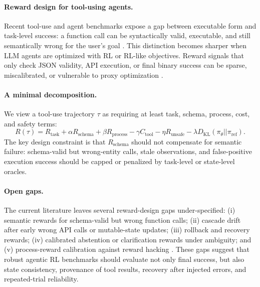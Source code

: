 \paragraph{Reward design for tool-using agents.}
Recent tool-use and agent benchmarks expose a gap between executable form and task-level success:
a function call can be syntactically valid, executable, and still semantically wrong for the user's goal
\citep{bfcl_2024,apigen_2024,tau_bench_2024,swe_bench_2023}.
This distinction becomes sharper when LLM agents are optimized with RL or RL-like objectives.
Reward signals that only check JSON validity, API execution, or final binary success can be sparse,
miscalibrated, or vulnerable to proxy optimization
\citep{toolrl_2025,agentprm_framework_2025,toolprmbench_2026,cm2_2026}.

\paragraph{A minimal decomposition.}
We view a tool-use trajectory $\tau$ as requiring at least task, schema, process, cost, and safety terms:
\[
R(\tau)=R_{\text{task}}+\alpha R_{\text{schema}}+\beta R_{\text{process}}
-\gamma C_{\text{tool}}-\eta R_{\text{unsafe}}
-\lambda D_{\mathrm{KL}}(\pi_\theta || \pi_{\mathrm{ref}}).
\]
The key design constraint is that $R_{\text{schema}}$ should not compensate for semantic failure:
schema-valid but wrong-entity calls, stale observations, and false-positive execution success should be
capped or penalized by task-level or state-level oracles.

\paragraph{Open gaps.}
The current literature leaves several reward-design gaps under-specified:
(i) semantic rewards for schema-valid but wrong function calls;
(ii) cascade drift after early wrong API calls or mutable-state updates;
(iii) rollback and recovery rewards;
(iv) calibrated abstention or clarification rewards under ambiguity; and
(v) process-reward calibration against reward hacking
\citep{webarena_2023,ragen_2025,uprop_2025,rebel_belief_2026,reasoning_trap_2025,internal_tool_hallu_2026}.
These gaps suggest that robust agentic RL benchmarks should evaluate not only final success, but also
state consistency, provenance of tool results, recovery after injected errors, and repeated-trial reliability.

